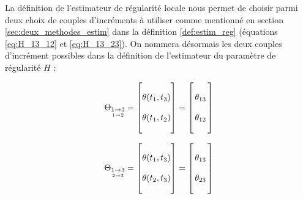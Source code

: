 La définition de l'estimateur de régularité locale nous permet de choisir parmi deux choix de couples d'incréments à utiliser comme mentionné en section \ref{sec:deux_methodes_estim} dans la définition \ref{def:estim_reg} (équations \ref{eq:H_13_12} et \ref{eq:H_13_23}). On nommera désormais les deux couples d'incrément possibles dans la définition de l'estimateur du paramètre de régularité $H$ :

\bigskip

\begin{minipage}{0.5\textwidth}
	\begin{equation}
		\displaystyle
		\Theta_{\underset{1 \rightarrow 2}{1 \rightarrow 3}} = \begin{bmatrix} \\ \theta(t_1, t_3) \\\\ \theta(t_1, t_2) \\ \phantom{.}\end{bmatrix}
				= \begin{bmatrix} \\ \, \theta_{13}\,  \\\\ \,  \theta_{12} \,  \\ \phantom{.}\end{bmatrix}
	\end{equation}
\end{minipage}
\hfill
\begin{minipage}{0.5\textwidth}
	\begin{equation}
		\displaystyle
		\Theta_{\underset{2 \rightarrow 3}{1 \rightarrow 3}} = \begin{bmatrix} \\ \theta(t_1, t_3) \\\\ \theta(t_2, t_3) \\ \phantom{.} \end{bmatrix}
				= \begin{bmatrix} \\ \,  \theta_{13} \,  \\\\ \, \theta_{23} \,  \\ \phantom{.}\end{bmatrix}
	\end{equation}
\end{minipage}


